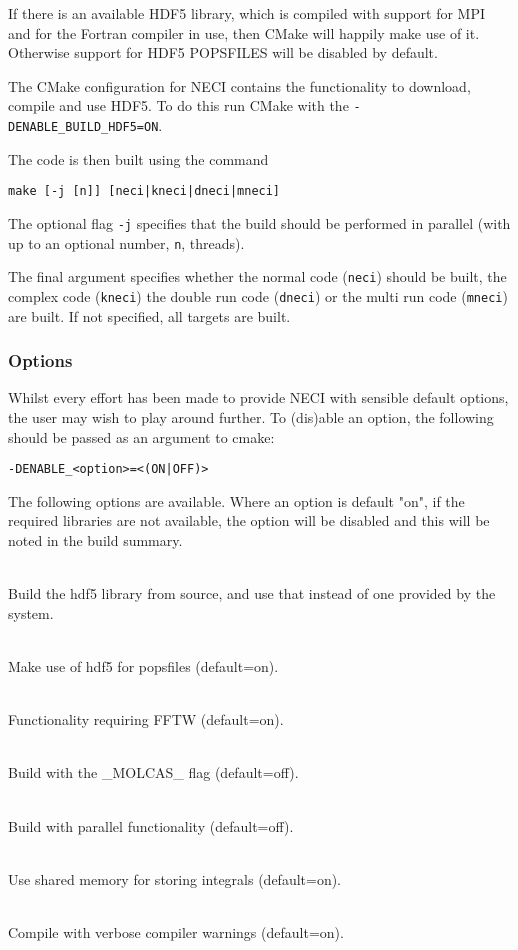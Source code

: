 \documentclass[a4paper,notitlepage]{scrreprt}
\newcommand\codeitem[1]{\needspace{1.5\baselineskip}\item[\textnormal{\ttfamily #1 \nopagebreak}] \hfill \\ \nopagebreak}
\let\code\lstinline
\begin{document}
	\begin{mdframed}[ %
		linewidth = 2pt, %
		linecolor = red, %
		roundcorner = 6pt, %
		leftmargin = 10, %
		rightmargin = 10, %
		backgroundcolor = gray!20
	]
	If there is an available HDF5 library, which is compiled with support for
	MPI and for the Fortran compiler in use, then CMake will happily make use
	of it. Otherwise support for HDF5 POPSFILES will be disabled by default.

	The CMake configuration for NECI contains the functionality to download,
	compile and use HDF5. To do this run CMake with the
    \code{-DENABLE_BUILD_HDF5=ON}.
	\end{mdframed}

	The code is then built using the command
	\begin{lstlisting}[gobble=4]
		make [-j [n]] [neci|kneci|dneci|mneci]
	\end{lstlisting}
	The optional flag \code{-j} specifies that the build should be
	performed in parallel (with up to an optional number, \code{n},
	threads).

	The final argument specifies whether the normal code (\code{neci})
	should be built, the complex code (\code{kneci}) the double run
	code (\code{dneci}) or the multi run code (\code{mneci}) are
	built. If not specified, all targets are built.

\subsubsection{Options}
    Whilst every effort has been made to provide NECI with sensible default options, the user
    may wish to play around further. To (dis)able an option, the following should be passed as
    an argument to cmake:
    \begin{lstlisting}[gobble=4]
        -DENABLE_<option>=<(ON|OFF)>
    \end{lstlisting}
    The following options are available. Where an option is default "on", if the required libraries
    are not available, the option will be disabled and this will be noted in the build summary.
    \begin{description}
        \codeitem{BUILD\_HDF5}
            Build the hdf5 library from source, and use that instead of one provided by the system.
        \codeitem{HDF5}
            Make use of hdf5 for popsfiles (default=on).
        \codeitem{FFTW}
            Functionality requiring FFTW (default=on).
        \codeitem{MOLCAS}
            Build with the \_MOLCAS\_ flag (default=off).
        \codeitem{MPI}
            Build with parallel functionality (default=off).
        \codeitem{SHARED\_MEMORY}
            Use shared memory for storing integrals (default=on).
        \codeitem{WARNINGS}
            Compile with verbose compiler warnings (default=on).
    \end{description}
\end{document}
